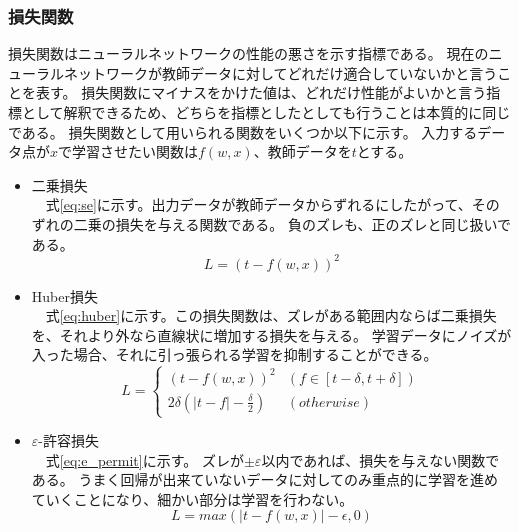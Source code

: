\documentclass[twocolumn,fleqn]{jsarticle}
\begin{document}
\subsubsection{損失関数}
損失関数はニューラルネットワークの性能の悪さを示す指標である。
現在のニューラルネットワークが教師データに対してどれだけ適合していないかと言うことを表す。
損失関数にマイナスをかけた値は、どれだけ性能がよいかと言う指標として解釈できるため、どちらを指標としたとしても行うことは本質的に同じである。
損失関数として用いられる関数をいくつか以下に示す。
入力するデータ点が$x$で学習させたい関数は$f(w,x)$、教師データを$t$とする。
\begin{itemize}
    \item 二乗損失 \\
    　式\ref{eq:se}に示す。出力データが教師データからずれるにしたがって、そのずれの二乗の損失を与える関数である。
    負のズレも、正のズレと同じ扱いである。
    \begin{equation}
        L = (t - f(w, x))^2
        \label{eq:se}
    \end{equation}
    \item Huber損失　\\
    　式\ref{eq:huber}に示す。この損失関数は、ズレがある範囲内ならば二乗損失を、それより外なら直線状に増加する損失を与える。
    学習データにノイズが入った場合、それに引っ張られる学習を抑制することができる。
    \begin{equation}
        L = \begin{cases}
            (t - f(w, x))^2 & (f \in [t - \delta, t + \delta]) \\
            2\delta(|t - f| - \frac{\delta}{2}) & (otherwise)
        \end{cases}
        \label{eq:huber}
    \end{equation}
    \item $\varepsilon$-許容損失 \\
    　式\ref{eq:e_permit}に示す。
    ズレが$\pm\varepsilon$以内であれば、損失を与えない関数である。
    うまく回帰が出来ていないデータに対してのみ重点的に学習を進めていくことになり、細かい部分は学習を行わない。
    \begin{equation}
        L = max(|t - f(w, x)| - \epsilon, 0)
        \label{eq:e_permit}
    \end{equation}
\end{itemize}
\end{document}
